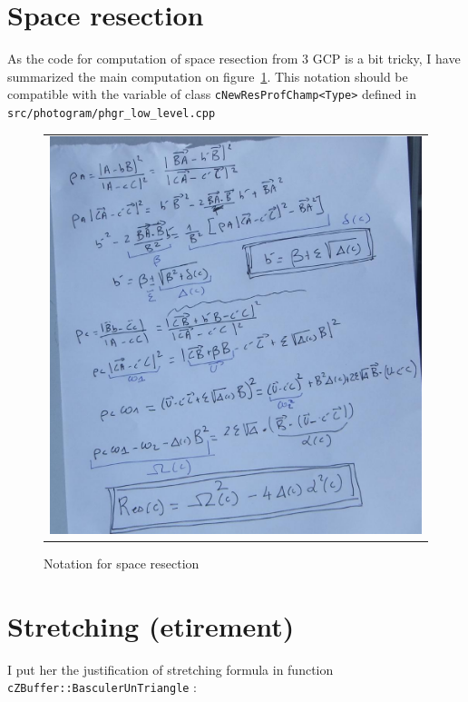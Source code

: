 \section{Space resection}


As the code for computation of space resection from $3$ GCP is a bit tricky, I have summarized the main
computation on figure~\ref{Not:ResSpace}. This notation should be compatible with the variable
of class {\tt cNewResProfChamp<Type>} defined in {\tt src/photogram/phgr\_low\_level.cpp}


\begin{figure}
\begin{tabular}{|c|}
   \hline \hline
   \includegraphics[width=160mm]{FIGS/Formules/NotattionSpace.JPG}
\end{tabular}
\label{Not:ResSpace}
\caption{Notation for space resection}
\end{figure}


\section{Stretching (etirement)}

I put her the justification of stretching formula in function {\tt cZBuffer::BasculerUnTriangle} :


